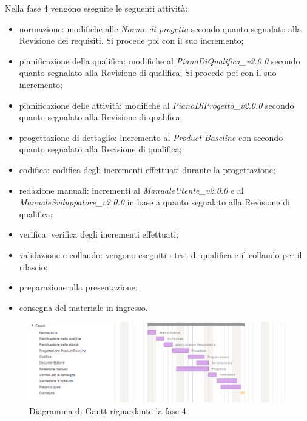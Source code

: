 Nella fase 4 vengono eseguite le seguenti attività:
\begin{itemize}
	\item normazione: modifiche alle \textit{Norme di progetto} secondo quanto segnalato alla Revisione dei requisiti. Si procede poi con il suo incremento;
	\item pianificazione della qualifica: modifiche al \textit{PianoDiQualifica\_v2.0.0} secondo quanto segnalato alla Revisione di qualifica; Si procede poi con il suo incremento;
	\item pianificazione delle attività: modifiche al \textit{PianoDiProgetto\_v2.0.0} secondo quanto segnalato alla Revisione di qualifica;
	\item progettazione di dettaglio: incremento al \textit{Product Baseline} con secondo quanto segnalato alla Recisione di qualifica;
	\item codifica: codifica degli incrementi effettuati durante la progettazione;
	\item redazione manuali: incrementi al \textit{ManualeUtente\_v2.0.0} e al \textit{ManualeSviluppatore\_v2.0.0} in base a quanto segnalato alla Revisione di qualifica;
	\item verifica: verifica degli incrementi effettuati;
	\item validazione e collaudo: vengono eseguiti i test di qualifica e il collaudo per il rilascio;
	\item preparazione alla presentazione;
	\item consegna del materiale in ingresso.
\end{itemize}

\begin{figure}[h]
	\centering
	\includegraphics[scale=0.70]{images/fase4.png}
	\caption{Diagramma di Gantt riguardante la fase 4}
\end{figure}